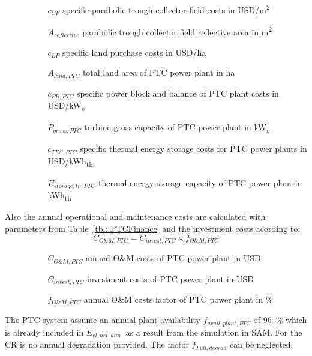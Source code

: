 \begin{itemize}
\item[ ] 
\begin{itemize}
\item[ ] 
\begin{itemize}
\item[$c_{CF}$]specific parabolic trough collector field costs in USD/m\textsuperscript{2}
\item[$A_{reflective}$]parabolic trough collector field reflective area in m\textsuperscript{2}
\item[$c_{LP}$]specific land purchase costs in USD/ha
\item[$A_{land,PTC}$]total land area of PTC power plant in ha
\item[$c_{PB,PTC}$]specific power block and balance of PTC plant costs in USD/kW\textsubscript{e}
\item[$P_{gross,PTC}$]turbine gross capacity of PTC power plant in kW\textsubscript{e}
\item[$c_{TES,PTC}$]specific thermal energy storage costs for PTC power plants in USD/kWh\textsubscript{th}
\item[$E_{storage,th,PTC}$]thermal energy storage capacity of PTC power plant in kWh\textsubscript{th}
\end{itemize}
\end{itemize}
\end{itemize}
Also the annual operational and maintenance costs are calculated with parameters from Table~\ref{tbl: PTCFinance} and the investment costs acording to:
\begin{equation}
C_{O\&M,PTC} = C_{invest,PTC} \times f_{O\&M,PTC}
\end{equation} 
\begin{itemize}
\item[ ] 
\begin{itemize}
\item[ ] 
\begin{itemize}
\item[$C_{O\&M,PTC}$]annual O\&M costs of PTC power plant in USD
\item[$C_{invest,PTC}$]investment costs of PTC power plant in USD
\item[$f_{O\&M,PTC}$]annual O\&M costs factor of PTC power plant in \%
\end{itemize}
\end{itemize}
\end{itemize}
The PTC system assume an annual plant availability $f_{avail,plant,PTC}$ of 96~\% which is already included in $E_{el,net,ann.}$ as a result from the simulation in SAM. For the CR is no annual degradation provided. The factor $f_{Full,degrad}$ can be neglected.
\pagebreak
